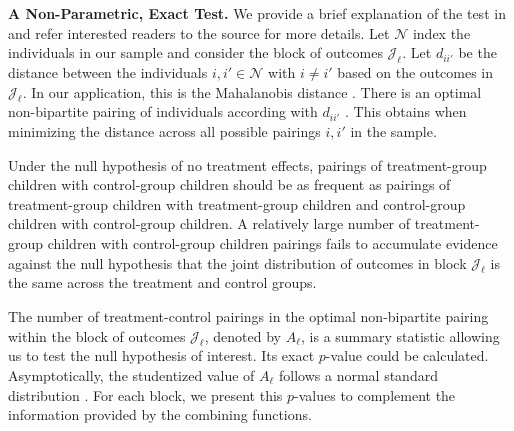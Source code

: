 \textbf{A Non-Parametric, Exact Test.} We provide a brief explanation of the test in \citet{Rosenbaum_2005_Distribution_JRSS} and refer interested readers to the source for more details. Let $\mathcal{N}$ index the individuals in our sample and consider the block of outcomes $\mathcal{J}_\ell$. Let $d_{ii'}$ be the distance between the individuals $i, i' \in \mathcal{N}$ with $i \neq i'$ based on the outcomes in $\mathcal{J}_\ell$. In our application, this is the Mahalanobis distance \citep{Mahalanobis_1936_PNISI}. There is an optimal non-bipartite pairing of individuals according with $d_{ii'}$ \citep{}. This obtains when minimizing the distance across all possible pairings $i, i'$ in the sample. 

Under the null hypothesis of no treatment effects, pairings of treatment-group children with control-group children should be as frequent as pairings of treatment-group children with treatment-group children and control-group children with control-group children. A relatively large number of treatment-group children with control-group children pairings fails to accumulate evidence against the null hypothesis that the joint distribution of outcomes in block $\mathcal{J}_\ell$ is the same across the treatment and control groups.

The number of treatment-control pairings in the optimal non-bipartite pairing within the block of outcomes $\mathcal{J}_\ell$, denoted by $A_\ell$, is a summary statistic allowing us to test the null hypothesis of interest. Its exact $p$-value could be calculated. Asymptotically, the studentized value of $A_\ell$ follows a normal standard distribution \citep{Rosenbaum_2005_Distribution_JRSS}. For each block, we present this $p$-values to complement the information provided by the combining functions.
